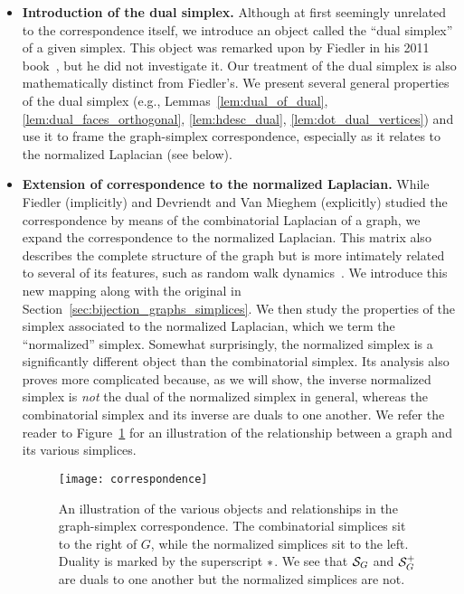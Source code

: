 \begin{itemize}
	\item {\bf Introduction of the dual simplex.} Although at first seemingly unrelated to the correspondence itself, we introduce an object  called the ``dual simplex'' of a given simplex. This object was remarked upon by Fiedler in his 2011 book~\cite{fiedler2011matrices}, but he did not investigate it. Our treatment of the dual  simplex is also  mathematically distinct from Fiedler's. We present several general properties of  the dual simplex (e.g., Lemmas~\ref{lem:dual_of_dual}, \ref{lem:dual_faces_orthogonal},  \ref{lem:hdesc_dual}, \ref{lem:dot_dual_vertices}) and use it to frame the graph-simplex correspondence, especially as it relates  to the normalized Laplacian (see below). 
	\item {\bf Extension of correspondence to the normalized Laplacian.}  While Fiedler (implicitly) and Devriendt and Van Mieghem (explicitly) studied the correspondence by means of the combinatorial Laplacian of a graph, we expand the correspondence to the normalized Laplacian.  This matrix also describes the complete structure of the graph but is more intimately related to several of its features, such as random walk dynamics~\cite{chung1997spectral}. We introduce this new mapping  along with the original in Section~\ref{sec:bijection_graphs_simplices}. 
	We then study the properties of the simplex associated to the normalized Laplacian, which we term the ``normalized'' simplex.  
	Somewhat surprisingly, the normalized simplex is a significantly different object than the combinatorial  simplex. Its analysis  also proves more complicated because, as we will show, the inverse normalized simplex  is \emph{not} the dual of the normalized  simplex in general, whereas the combinatorial simplex and its inverse are duals to  one  another. 	 
	We refer  the reader to Figure~\ref{fig:correspondence} for an illustration of the relationship between a graph and its various simplices. 
	
	\begin{figure}
		\centering 
		\texttt{[image: correspondence]}
		\caption{An illustration of the various objects and relationships in the graph-simplex correspondence. The combinatorial simplices sit to the right of $G$, while the normalized simplices sit to the left. Duality  is marked by the superscript $*$. 
			We see that  $\mathcal{S}_G$ and $\mathcal{S}_G^+$ are duals to one another but the normalized simplices are not.  }
		\label{fig:correspondence}
	\end{figure}
	


\end{itemize}
